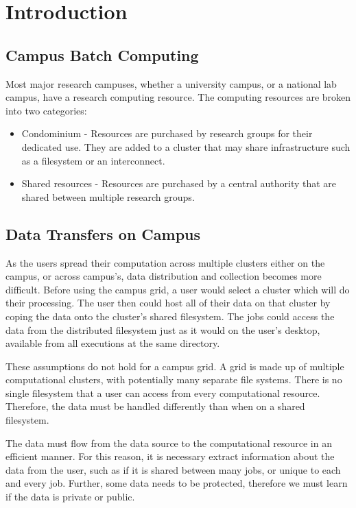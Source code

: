 \chapter{Introduction}

\section{Campus Batch Computing}

Most major research campuses, whether a university campus, or a national lab campus, have a research computing resource.  The computing resources are broken into two categories:

\begin{itemize}

\item Condominium - Resources are purchased by research groups for their dedicated use.  They are added to a cluster that may share infrastructure such as a filesystem or an interconnect.
\item Shared resources -  Resources are purchased by a central authority that are shared between multiple research groups.

\end{itemize}



\section{Data Transfers on Campus}

As the users spread their computation across multiple clusters either on the campus, or across campus's, data distribution and collection becomes more difficult.  Before using the campus grid, a user would select a cluster which will do their processing.  The user then could host all of their data on that cluster by coping the data onto the cluster's shared filesystem.  The jobs could access the data from the distributed filesystem just as it would on the user's desktop, available from all executions at the same directory.

These assumptions do not hold for a campus grid.  A grid is made up of multiple computational clusters, with potentially many separate file systems.  There is no single filesystem that a user can access from every computational resource.  Therefore, the data must be handled differently than when on a shared filesystem.  

The data must flow from the data source to the computational resource in an efficient manner.  For this reason, it is necessary extract information about the data from the user, such as if it is shared between many jobs, or unique to each and every job.  Further, some data needs to be protected, therefore we must learn if the data is private or public.



